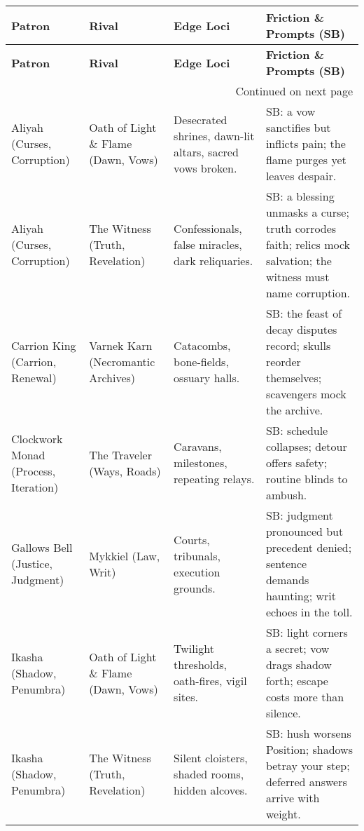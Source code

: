 \begin{longtable}{@{}p{3.3cm}p{3.3cm}p{4.6cm}p{7.2cm}@{}}
  \toprule
  \textbf{Patron} & \textbf{Rival} & \textbf{Edge Loci} & \textbf{Friction \& Prompts (SB)} \\
  \midrule
  \endfirsthead

  \toprule
  \textbf{Patron} & \textbf{Rival} & \textbf{Edge Loci} & \textbf{Friction \& Prompts (SB)} \\
  \midrule
  \endhead

  \midrule
  \multicolumn{4}{r}{{Continued on next page}} \\
  \endfoot

  \bottomrule
  \endlastfoot

  Aliyah (Curses, Corruption) & Oath of Light \& Flame (Dawn, Vows) &
  Desecrated shrines, dawn-lit altars, sacred vows broken. &
  SB: a vow sanctifies but inflicts pain; the flame purges yet leaves despair. \\

  Aliyah (Curses, Corruption) & The Witness (Truth, Revelation) &
  Confessionals, false miracles, dark reliquaries. &
  SB: a blessing unmasks a curse; truth corrodes faith; relics mock salvation; the witness must name corruption. \\

  Carrion King (Carrion, Renewal) & Varnek Karn (Necromantic Archives) &
  Catacombs, bone-fields, ossuary halls. &
  SB: the feast of decay disputes record; skulls reorder themselves; scavengers mock the archive. \\

  Clockwork Monad (Process, Iteration) & The Traveler (Ways, Roads) &
  Caravans, milestones, repeating relays. &
  SB: schedule collapses; detour offers safety; routine blinds to ambush. \\

  Gallows Bell (Justice, Judgment) & Mykkiel (Law, Writ) &
  Courts, tribunals, execution grounds. &
  SB: judgment pronounced but precedent denied; sentence demands haunting; writ echoes in the toll. \\

  Ikasha (Shadow, Penumbra) & Oath of Light \& Flame (Dawn, Vows) &
  Twilight thresholds, oath-fires, vigil sites. &
  SB: light corners a secret; vow drags shadow forth; escape costs more than silence. \\

  Ikasha (Shadow, Penumbra) & The Witness (Truth, Revelation) &
  Silent cloisters, shaded rooms, hidden alcoves. &
  SB: hush worsens Position; shadows betray your step; deferred answers arrive with weight. \\


\end{longtable}
